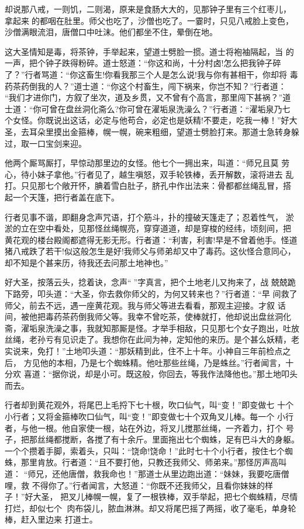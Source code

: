 却说那八戒，一则饥，二则渴，原来是食肠大大的，见那钟子里有三个红枣儿，
拿起来的都咽在肚里。师父也吃了，沙僧也吃了。一霎时，只见八戒脸上变色，
沙僧满眼流泪，唐僧口中吐沫。他们都坐不住，晕倒在地。

这大圣情知是毒，将茶钟，手举起来，望道士劈脸一掼。道士将袍袖隔起，当
的一声，把个钟子跌得粉碎。道士怒道：“你这和尚，十分村卤!怎么把我钟子碎
了？”行者骂道：“你这畜生!你看我那三个人是怎么说!我与你有甚相干，你却将
毒药茶药倒我的人？”道士道：“你这个村畜生，闯下祸来，你岂不知？”行者道：
“我们才进你门，方叙了坐次，道及乡贯，又不曾有个高言，那里闯下甚祸？”道
士道：“你可曾在盘丝洞化斋么?你可曾在濯垢泉洗澡么？”行者道：“濯垢泉乃七
个女怪。你既说出这话，必定与他苟合，必定也是妖精!不要走，吃我一棒！”好大
圣，去耳朵里摸出金箍棒，幌一幌，碗来粗细，望道士劈脸打来。那道士急转身躲
过，取一口宝剑来迎。

他两个厮骂厮打，早惊动那里边的女怪。他七个一拥出来，叫道：“师兄且莫
劳心，待小妹子拿他。”行者见了，越生嗔怒，双手轮铁棒，丢开解数，滚将进去
乱打。只见那七个敞开怀，腆着雪白肚子，脐孔中作出法来：骨都都丝绳乱冒，搭
起一个天篷，把行者盖在底下。

行者见事不谐，即翻身念声咒语，打个筋斗，扑的撞破天篷走了；忍着性气，
淤淤的立在空中看处，见那怪丝绳幌亮，穿穿道道，却是穿梭的经纬，顷刻间，把
黄花观的楼台殿阁都遮得无影无形。行者道：“利害，利害!早是不曾着他手。怪道
猪八戒跌了若干!似这般怎生是好!我师父与师弟却又中了毒药。这伙怪合意同心，
却不知是个甚来历，待我还去问那土地神也。”

好大圣，按落云头，捻着诀，念声“”字真言，把个土地老儿又拘来了，战
兢兢跪下路旁，叩头道：“大圣，你去救你师父的，为何又转来也？”行者道：“早
间救了师父，前去不远，遇一座黄花观。我与师父等进去看看，那观主迎接。才叙
话间，被他把毒药茶药倒我师父等。我幸不曾吃茶，使棒就打，他却说出盘丝洞化
斋，濯垢泉洗澡之事，我就知那厮是怪。才举手相敌，只见那七个女子跑出，吐放
丝绳，老孙亏有见识走了。我想你在此间为神，定知他的来历。是个甚么妖精，老
实说来，免打！”土地叩头道：“那妖精到此，住不上十年。小神自三年前检点之后，
方见他的本相，乃是七个蜘蛛精。他吐那些丝绳，乃是蛛丝。”行者闻言，十分欢
喜道：“据你说，却是小可。既这般，你回去，等我作法降他也。”那土地叩头而去。

行者却到黄花观外，将尾巴上毛捋下七十根，吹口仙气，叫“变！”即变做七
十个小行者；又将金箍棒吹口仙气，叫“变！”即变做七十个双角叉儿棒。每一个
小行者，与他一根。他自家使一根，站在外边，将叉儿搅那丝绳，一齐着力，打个
号子，把那丝绳都搅断，各搅了有十余斤。里面拖出七个蜘蛛，足有巴斗大的身躯。
一个个攒着手脚，索着头，只叫：“饶命!饶命！”此时七十个小行者，按住七个蜘
蛛，那里肯放。行者道：“且不要打他，只教还我师父、师弟来。”那怪厉声高叫道：
“师兄，还他唐僧，救我命也！”那道士从里边跑出道：“妹妹，我要吃唐僧哩，救
不得你了。”行者闻言，大怒道：“你既不还我师父，且看你妹妹的样子！”好大圣，
把叉儿棒幌一幌，复了一根铁棒，双手举起，把七个蜘蛛精，尽情打烂，却似七个
肉布袋儿，脓血淋淋。却又将尾巴摇了两摇，收了毫毛，单身轮棒，赶入里边来
打道士。

